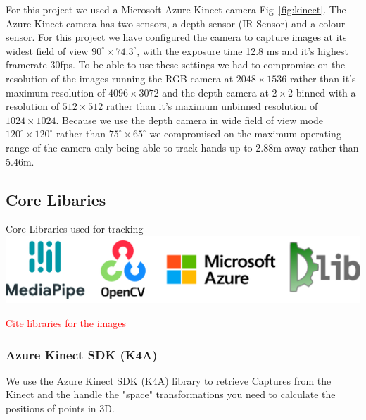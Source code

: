 For this project we used a Microsoft Azure Kinect camera \tocite Fig~\ref{fig:kinect}. The Azure Kinect camera has two sensors, a depth sensor (IR Sensor) and a colour sensor. For this project we have configured the camera to capture images at its widest field of view $90^{\circ} \times 74.3^{\circ} $, with the exposure time 12.8 ms and it's highest framerate 30fps. To be able to use these settings we had to compromise on the resolution of the images running the RGB camera at $2048 \times 1536$ rather than it's maximum resolution of $4096 \times 3072$ and the depth camera at $2\times2$ binned with a resolution of $512 \times 512$ rather than it's maximum unbinned resolution of $1024 \times 1024$. Because we use the depth camera in wide field of view mode $120^{\circ} \times 120^{\circ} $ rather than $75^{\circ} \times 65^{\circ} $ we compromised on the maximum operating range of the camera only being able to track hands up to 2.88m away rather than 5.46m. \\



\subsection{Core Libaries}  
\begin{figureBox}[label={fig:core-libs}, width=0.8\linewidth]{Core Libraries used for tracking}
    \includegraphics[width = 1.0\linewidth]{./implementation/figures/libs.png}
\end{figureBox}

\textcolor{red}{Cite libraries for the images}

\subsubsection{Azure Kinect SDK (K4A)}

We use the Azure Kinect SDK (K4A) library to retrieve Captures from the Kinect and the handle the "space" transformations you need to calculate the positions of points in 3D.


